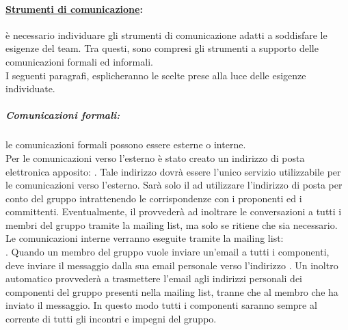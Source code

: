 \paragraph{\underline{Strumenti di comunicazione}:} è necessario individuare gli strumenti di comunicazione adatti a soddisfare le esigenze del team. Tra questi, sono compresi gli strumenti a supporto delle comunicazioni formali ed informali.\\
I seguenti paragrafi, esplicheranno le scelte prese alla luce delle esigenze individuate.

\subparagraph{Comunicazioni formali:} le comunicazioni formali possono essere esterne o interne.\\
Per le comunicazioni verso l'esterno è stato creato un indirizzo di posta elettronica apposito: \email{}. Tale indirizzo dovrà essere l'unico servizio utilizzabile per le comunicazioni verso l'esterno. Sarà solo il \projectManager{} ad utilizzare l'indirizzo di posta per conto del gruppo \authorName{} intrattenendo le corrispondenze con i proponenti ed i committenti. Eventualmente, il \projectManager{} provvederà ad inoltrare le conversazioni a tutti i membri del gruppo tramite la mailing list\g{}, ma solo se ritiene che sia necessario.\\
Le comunicazioni interne verranno eseguite tramite la mailing list\g{}:\\ \email{}. Quando un membro del gruppo vuole inviare un'email a tutti i componenti, deve inviare il messaggio dalla sua email personale verso l'indirizzo \email{}. Un inoltro automatico provvederà a trasmettere l'email agli indirizzi personali dei componenti del gruppo presenti nella mailing list\g{}, tranne che al membro che ha inviato il messaggio. In questo modo tutti i componenti saranno sempre al corrente di tutti gli incontri e impegni del gruppo.

